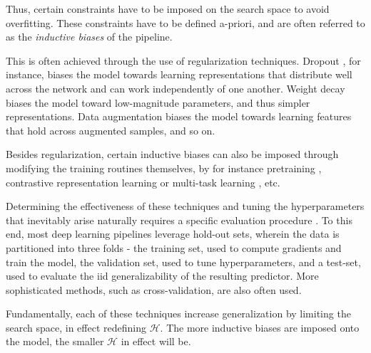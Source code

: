 	Thus, certain constraints have to be imposed on the search space to avoid overfitting. These constraints have to be defined a-priori, and are often referred to as the \textit{ inductive biases} of the pipeline. 

	This is often achieved through the use of regularization techniques. Dropout \cite{dropout}, for instance, biases the model towards learning representations that distribute well across the network and can work independently of one another. Weight decay \cite{weight_decay} biases the model toward low-magnitude parameters, and thus simpler representations. Data augmentation biases the model towards learning features that hold across augmented samples, and so on.

	Besides regularization, certain inductive biases can also be imposed through modifying the training routines themselves, by for instance pretraining \cite{pretrain}, contrastive representation learning \cite{contrastive} or multi-task learning \cite{ddanet, multitask}, etc.

	Determining the effectiveness of these techniques and tuning the hyperparameters that inevitably arise naturally requires a specific evaluation procedure \cite{deep_learning_book}. To this end, most deep learning pipelines leverage hold-out sets, wherein the data is partitioned into three folds - the training set, used to compute gradients and train the model, the validation set, used to tune hyperparameters, and a test-set, used to evaluate the \gls{iid} generalizability of the resulting predictor. More sophisticated methods, such as cross-validation, are also often used. 

	Fundamentally, each of these techniques increase generalization by limiting the search space, in effect redefining \(\mathcal{H}\). The more inductive biases are imposed onto the model, the smaller \(\mathcal{H}\) in effect will be. 

